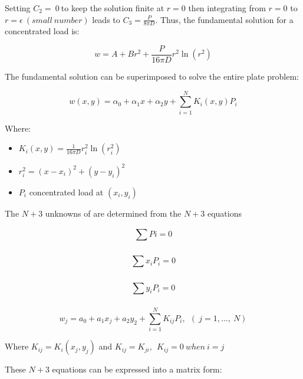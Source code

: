 Setting $C_{2} = \ 0\ $to keep the solution finite at $r = 0$ then
integrating from $r = 0$ to $r = \epsilon\ (small\ number)$ leads to
$C_{3} = \frac{P}{8\pi D}$. Thus, the fundamental solution for a
concentrated load is:

\begin{equation}
w = A + Br^{2} + \frac{P}{16\pi D}r^{2}\ln\left( r^{2} \right)
\end{equation}


The fundamental solution can be superimposed to solve the entire plate
problem:

\begin{equation}
w(x,y) = \alpha_{0} + \alpha_{1}x + \alpha_{2}y + \sum_{i = 1}^{N}{K_{i}(x,y)P_{i}}
\end{equation}


Where:

\begin{itemize}
\item
  $K_{i}(x,y) = \frac{1}{16\pi D}r_{i}^{2}\ln\left( r_{i}^{2} \right)$
\item
  $r_{i}^{2} = \left( x - x_{i} \right)^{2} + \left( y - y_{i} \right)^{2}$
\item
  $P_{i}$ concentrated load at $\left( x_{i},y_{i} \right)$
\end{itemize}

The $N+3$ unknowns of are determined from the $N+3$ equations

\begin{equation}
\sum_{}^{}{Pi} = 0
\end{equation}

\begin{equation}
  \sum_{}^{}{x_{i}P_{i}} = 0
\end{equation}

\begin{equation}
  \sum_{}^{}{y_{i}P_{i}} = 0
\end{equation}

\begin{equation}
  w_{j} = a_{0} + a_{1}x_{j} + a_{2}y_{2} + \sum_{i = 1}^{N}K_{ij}P_{i},\ \ (\ j = 1,\ldots,\ N)  
\end{equation}

Where $K_{ij} = K_{i}\left( x_{j},y_{j} \right)$ and
$K_{ij} = K_{ji},\ \ K_{ij} = 0\ when\ i = j$

These $N+3$ equations can be expressed into a matrix form:

